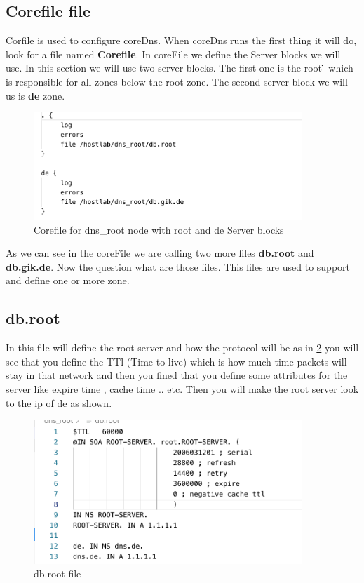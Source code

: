 \subsection{Corefile file}
Corfile is used to configure coreDns. When coreDns runs the first thing it will do, look for a file named \textbf{Corefile}. In coreFile we define the Server blocks we will use. In this section we will use two server blocks. The first one is the root \textbf{\.} which is responsible for all zones below the root zone. The second server block we will us is \textbf{de} zone.

 \begin{figure}[H]
\centering
  \includegraphics[width=0.9\textwidth]{Images/coreFilednsRoot.png}
  \caption{Corefile for dns\_root node with root and de Server blocks}
  \label{fig:2.3}
\end{figure}
As we can see in the coreFile we are calling two more files \textbf{db.root} and \textbf{db.gik.de}. Now the question what are those files. This files are used to support and define  one or more zone.
\subsection{db.root}
In this file will define the root server and how the protocol will be as in \ref{fig:2.4}
you will see that you define the TTl (Time to live) which is how much time packets will stay in that network and then you fined that you define some attributes for the server like expire time , cache time .. etc. Then you will make the root server look to the ip of de as shown.

 \begin{figure}[H]
\centering
  \includegraphics[width=0.9\textwidth]{Images/dpRoot.png}
  \caption{db.root file}
  \label{fig:2.4}
\end{figure}

